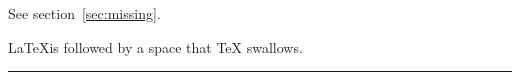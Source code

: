 \documentclass{article}
\begin{document}
See section~\ref{sec:missing}.

\LaTeX is followed by a space that TeX swallows.

\noindent\rule{1.2\textwidth}{1pt}
\end{document}

